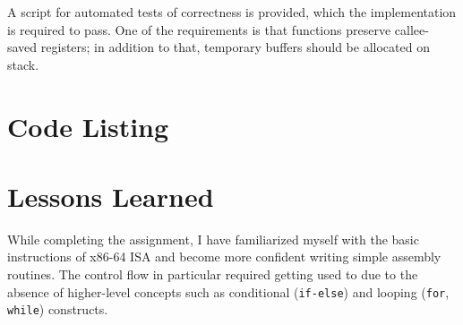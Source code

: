 \documentclass[12pt,a4paper]{report}
\begin{document}
A script for automated tests of correctness is provided, which the implementation is required to pass. One of the requirements is that functions preserve callee-saved registers; in addition to that, temporary buffers should be allocated on stack.

\section*{Code Listing}



\section*{Lessons Learned}

While completing the assignment, I have familiarized myself with the basic instructions of x86-64 ISA and become more confident writing simple assembly routines. The control flow in particular required getting used to due to the absence of higher-level concepts such as conditional (\texttt{if-else}) and looping (\texttt{for}, \texttt{while}) constructs.
\end{document}
